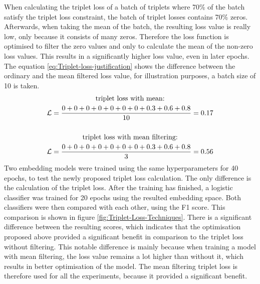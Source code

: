 \newline
\newline
When calculating the triplet loss of a batch of triplets where 70\% of the batch satisfy the triplet loss constraint, the batch of triplet losses contains 70\% zeros. Afterwards, when taking the mean of the batch, the resulting loss value is really low, only because it consists of many zeros. Therefore the loss function is optimised to filter the zero values and only to calculate the mean of the non-zero loss values. This results in a significantly higher loss value, even in later epochs. The equation \ref{eq:Triplet-loss-justification} shows the difference between the ordinary and the mean filtered loss value, for illustration purposes, a batch size of 10 is taken.
\begin{equation}
    \centering
    \begin{gathered}
        \text{triplet loss with mean:}\\
        \mathcal{L} = \frac{0 + 0+ 0+ 0+ 0+ 0+ 0+ 0.3+ 0.6+ 0.8}{10} = 0.17 \\
        \\
        \text{triplet loss with mean filtering:}\\
        \mathcal{L} = \frac{0+ 0+ 0+ 0+ 0+ 0+ 0+ 0.3+ 0.6+ 0.8}{3} = 0.56
    \end{gathered}
    \label{eq:Triplet-loss-justification}
\end{equation}
Two embedding models were trained using the same hyperparameters for 40 epochs, to test the newly proposed triplet loss calculation. The only difference is the calculation of the triplet loss. After the training has finished, a logistic classifier was trained for 20 epochs using the resulted embedding space. Both classifiers were then compared with each other, using the F1 score. This comparison is shown in figure \ref{fig:Triplet-Loss-Techniques}. There is a significant difference between the resulting scores, which indicates that the optimisation proposed above provided a significant benefit in comparison to the triplet loss without filtering. This notable difference is mainly because when training a model with mean filtering, the loss value remains a lot higher than without it, which results in better optimisation of the model. The mean filtering triplet loss is therefore used for all the experiments, because it provided a significant benefit.

